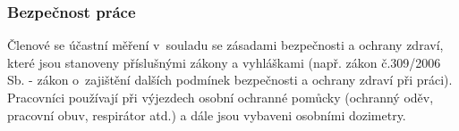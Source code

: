 \subsubsection{Bezpečnost práce}

Členové  se účastní měření v~souladu se zásadami bezpečnosti a
ochrany zdraví, které jsou stanoveny příslušnými zákony a vyhláškami
(např. zákon č.309/2006 Sb. - zákon o~zajištění dalších podmínek
bezpečnosti a ochrany zdraví při práci). Pracovníci používají při
výjezdech osobní ochranné pomůcky (ochranný oděv, pracovní obuv,
respirátor atd.) a dále jsou vybaveni osobními dozimetry.

